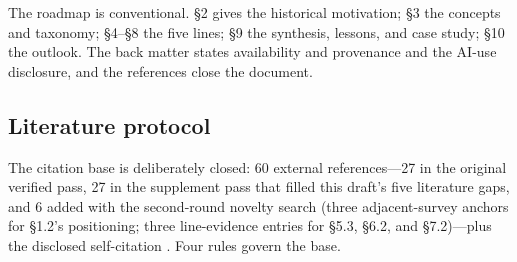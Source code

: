 \documentclass[11pt,a4paper]{article}
\begin{document}
The roadmap is conventional. §2 gives the historical motivation; §3 the concepts and taxonomy; §4–§8 the five lines; §9 the synthesis, lessons, and case study; §10 the outlook. The back matter states availability and provenance and the AI-use disclosure, and the references close the document.

\subsection{Literature protocol}

The citation base is deliberately closed: 60 external references—27 in the original verified pass, 27 in the supplement pass that filled this draft's five literature gaps, and 6 added with the second-round novelty search (three adjacent-survey anchors for §1.2's positioning; three line-evidence entries for §5.3, §6.2, and §7.2)—plus the disclosed self-citation \cite{key04}. Four rules govern the base.
\end{document}
